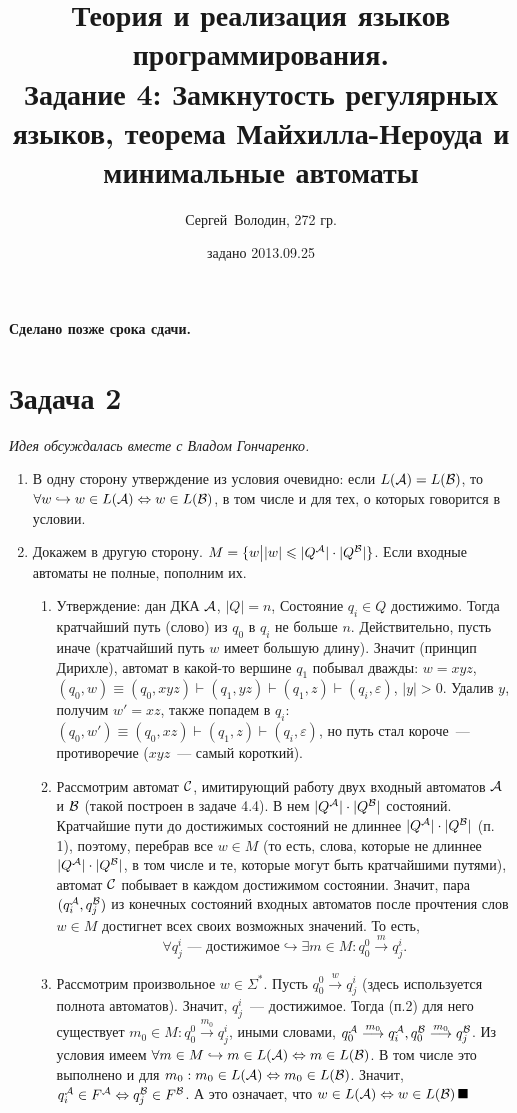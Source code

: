 \documentclass[a4paper]{article}
\title{Теория и реализация языков программирования.\\Задание 4: Замкнутость регулярных языков, теорема Майхилла-Нероуда и минимальные автоматы}
\date{задано 2013.09.25}
\author{Сергей~Володин, 272 гр.}
\def\A{{\cal A}}
\def\B{{\cal B}}
\def\C{{\cal C}}
\begin{document}
\maketitle
{\bf Сделано позже срока сдачи.}
\section*{Задача 2}
{\em{Идея обсуждалась вместе с Владом Гончаренко.}}
\begin{enumerate}[1.]
\item В одну сторону утверждение из условия очевидно: если $L(\A)=L(\B)$, то $\forall w\hookrightarrow w\in L(\A)\Leftrightarrow w\in L(\B)$, в том числе и для тех, о которых говорится в условии.
\item Докажем в другую сторону. $M=\{w\big ||w|\leqslant |Q^\A|\cdot |Q^\B|\}$. Если входные автоматы не полные, пополним их.
\begin{enumerate}[1.]
\item Утверждение: дан ДКА $\A$, $|Q|=n$, Состояние $q_i\in Q$ достижимо. Тогда кратчайший путь (слово) из $q_0$ в $q_i$ не больше $n$. Действительно, пусть иначе (кратчайший путь $w$ имеет большую длину). Значит (принцип Дирихле), автомат в какой-то вершине $q_1$ побывал дважды:  $w=xyz$, $(q_0,w)\equiv(q_0,xyz)\vdash(q_1,yz)\vdash(q_1,z)\vdash(q_i,\varepsilon)$, $|y|>0$. Удалив $y$, получим $w'=xz$, также попадем в $q_i$: $(q_0,w')\equiv(q_0,xz)\vdash(q_1,z)\vdash(q_i,\varepsilon)$, но путь стал короче~--- противоречие ($xyz$~--- самый короткий).
\item Рассмотрим автомат $\C$, имитирующий работу двух входный автоматов $\A$ и $\B$ (такой построен в задаче 4.4). В нем $|Q^\A| \cdot |Q^\B|$ состояний. Кратчайшие пути до достижимых состояний не длиннее $|Q^\A| \cdot |Q^\B|$ (п. 1), поэтому, перебрав все $w\in M$ (то есть, слова, которые не длиннее $|Q^\A| \cdot |Q^\B|$, в том числе и те, которые могут быть кратчайшими путями), автомат $\C$ побывает в каждом достижимом состоянии. Значит, пара $(q^\A_i,q^\B_j)$ из конечных состояний входных автоматов после прочтения слов $w\in M$ достигнет всех своих возможных значений. То есть, $$\forall q^i_j\mbox{~--- достижимое}\hookrightarrow\exists m\in M\colon q^0_0\overset{m}{\longrightarrow}q^i_j.$$
\item Рассмотрим произвольное $w\in\Sigma^*$. Пусть $q^0_0\overset{w}{\longrightarrow}q^i_j$ (здесь используется полнота автоматов). Значит, $q^i_j$~--- достижимое. Тогда (п.2) для него существует $m_0\in M\colon q^0_0\overset{m_0}{\longrightarrow}q^i_j$, иными словами, $q^\A_0\overset{m_0}{\longrightarrow}q^\A_i,q^\B_0\overset{m_0}{\longrightarrow}q^\B_j$.\newline
Из условия имеем $\forall m\in M\hookrightarrow m\in L(\A)\Leftrightarrow m\in L(\B)$. В том числе это выполнено и для $m_0: m_0\in L(\A)\Leftrightarrow m_0\in L(\B)$. Значит, $q^\A_i\in F^\A\Leftrightarrow q^\B_j\in F^\B$. А это означает, что $w\in L(\A)\Leftrightarrow w\in L(\B)\,\blacksquare$
\end{enumerate}
\end{enumerate}
\end{document}
